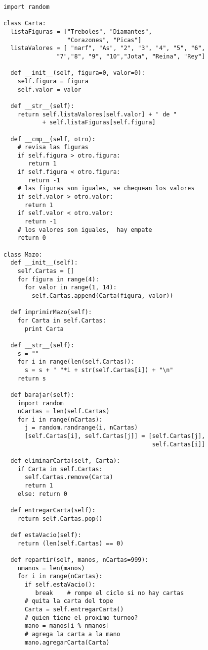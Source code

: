 \beforeverb
\begin{verbatim}
import random

class Carta:
  listaFiguras = ["Treboles", "Diamantes", 
                  "Corazones", "Picas"]
  listaValores = [ "narf", "As", "2", "3", "4", "5", "6", 
               "7","8", "9", "10","Jota", "Reina", "Rey"]

  def __init__(self, figura=0, valor=0):
    self.figura = figura
    self.valor = valor

  def __str__(self):
    return self.listaValores[self.valor] + " de " 
           + self.listaFiguras[self.figura]

  def __cmp__(self, otro):
    # revisa las figuras
    if self.figura > otro.figura: 
       return 1
    if self.figura < otro.figura: 
       return -1
    # las figuras son iguales, se chequean los valores
    if self.valor > otro.valor: 
      return 1
    if self.valor < otro.valor: 
      return -1
    # los valores son iguales,  hay empate
    return 0

class Mazo:
  def __init__(self):
    self.Cartas = []
    for figura in range(4):
      for valor in range(1, 14):
        self.Cartas.append(Carta(figura, valor))

  def imprimirMazo(self):
    for Carta in self.Cartas:
      print Carta

  def __str__(self):
    s = ""
    for i in range(len(self.Cartas)):
      s = s + " "*i + str(self.Cartas[i]) + "\n"
    return s

  def barajar(self):
    import random
    nCartas = len(self.Cartas)
    for i in range(nCartas):
      j = random.randrange(i, nCartas)
      [self.Cartas[i], self.Cartas[j]] = [self.Cartas[j], 
                                          self.Cartas[i]]

  def eliminarCarta(self, Carta):
    if Carta in self.Cartas:
      self.Cartas.remove(Carta)
      return 1
    else: return 0

  def entregarCarta(self):
    return self.Cartas.pop()

  def estaVacio(self):
    return (len(self.Cartas) == 0)

  def repartir(self, manos, nCartas=999):
    nmanos = len(manos)
    for i in range(nCartas):
      if self.estaVacio(): 
         break    # rompe el ciclo si no hay cartas
      # quita la carta del tope
      Carta = self.entregarCarta()      
      # quien tiene el proximo turnoo?
      mano = manos[i % nmanos]    
      # agrega la carta a la mano
      mano.agregarCarta(Carta)         


\end{verbatim}
